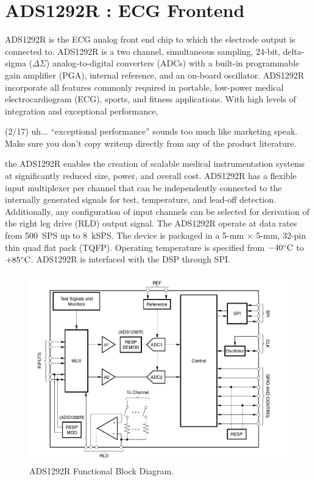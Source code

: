 \section{ADS1292R : ECG Frontend}

ADS1292R is the ECG analog front end chip to which the electrode
output is connected to. ADS1292R is a two channel, simultaneous
sampling, 24-bit, delta-sigma ($\Delta$$\Sigma$) analog-to-digital
converters (ADCs) with a built-in programmable gain amplifier (PGA),
internal reference, and an on-board oscillator. ADS1292R incorporate
all features commonly required in portable, low-power medical
electrocardiogram (ECG), sports, and fitness applications. With high
levels of integration and exceptional performance,

\begin{cmtPai}
	(2/17) uh... ``exceptional performance'' sounds too much like
	marketing speak.  Make sure you don't copy writeup directly from
any of the product literature.
\end{cmtPai}
the ADS1292R enables the creation of scalable medical instrumentation
systems at significantly reduced size, power, and overall cost.
ADS1292R has a flexible input multiplexer per channel that can be
independently connected to the internally generated signals for test,
temperature, and lead-off detection. Additionally, any configuration
of input channels can be selected for derivation of the right leg
drive (RLD) output signal.  The ADS1292R operate at data rates from
500~SPS up to 8~kSPS. The device is packaged in a 5-mm $\times$ 5-mm,
32-pin thin quad flat pack (TQFP). Operating temperature is specified
from $-40^{\circ}\text{C}$ to $+85^{\circ}\text{C}$. ADS1292R is interfaced with the DSP
through SPI.

 \begin{figure}
 	\centering
 	\includegraphics[scale = 0.7 ]{ADS1292R}
\caption{ADS1292R Functional Block Diagram. \cite{ads}}
\label{ADS1292R}
 \end{figure}
 

